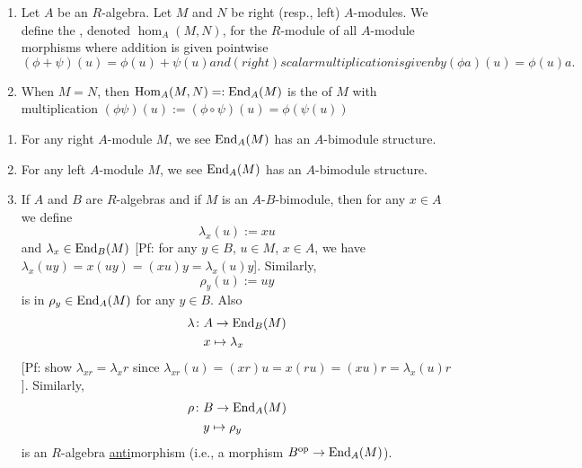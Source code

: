 \begin{definition}\label{defn:1.6}
\begin{enumerate}
\item 
Let $A$ be an $R$-algebra. Let $M$ and $N$ be right (resp., left)
$A$-modules. We define the , denoted $\hom_{A}(M,N)$, for the $R$-module of all
$A$-module morphisms where addition is given pointwise
\begin{subequations}
\begin{equation}
(\phi+\psi)(u)=\phi(u)+\psi(u)
\end{equation}
and (right) scalar multiplication is given by
\begin{equation}
(\phi a)(u)=\phi(u)a.
\end{equation}
\end{subequations}
\item 
When $M=N$, then $\operatorname{Hom}_{A}(M,N)=:\operatorname{End}_{A}(M)$ is the
 of $M$ with multiplication $(\phi\psi)(u):=(\phi\circ\psi)(u)=\phi(\psi(u))$
\end{enumerate}
\end{definition}

\begin{note}
\begin{enumerate}
\item For any right $A$-module $M$, we see $\operatorname{End}_{A}(M)$ has an $A$-bimodule
structure. 
\item For any left $A$-module $M$, we see $\operatorname{End}_{A}(M)$ has an
$A$-bimodule structure.
\item If $A$ and $B$ are $R$-algebras and if $M$ is an
  $A$-$B$-bimodule, then for any $x\in A$ we define
  \begin{equation}
\lambda_{x}(u):=xu
  \end{equation}
  and $\lambda_{x}\in\operatorname{End}_{B}(M)$ [Pf: for any $y\in B$, $u\in M$,
    $x\in A$, we have $\lambda_{x}(uy)=x(uy)=(xu)y=\lambda_{x}(u)y$].
  Similarly,
\begin{equation}
\rho_{y}(u):=uy
\end{equation}
is in $\rho_{y}\in\operatorname{End}_{A}(M)$ for any $y\in B$. Also
\begin{equation}
\begin{split}
\lambda\colon &A\to\operatorname{End}_{B}(M)\\
&x\mapsto\lambda_{x}
\end{split}
\end{equation}
[Pf: show $\lambda_{xr}=\lambda_{x}r$ since $\lambda_{xr}(u)=(xr)u=x(ru)=(xu)r=\lambda_{x}(u)r$].
Similarly,
\begin{equation}
\begin{split}
\rho\colon&B\to\operatorname{End}_{A}(M)\\
&y\mapsto\rho_{y}
\end{split}
\end{equation}
is an $R$-algebra \underline{anti}morphism (i.e., a morphism $B^{\text{op}}\to\operatorname{End}_{A}(M)$).
\end{enumerate}
\end{note}

